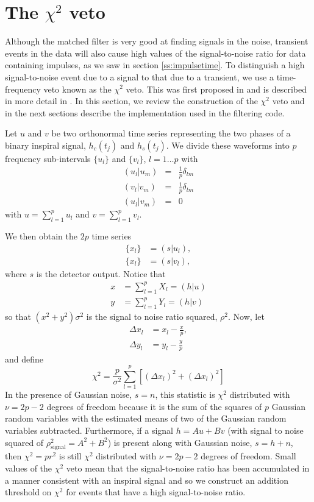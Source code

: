 \section{The $\chi^2$ veto}
\label{s:chisqcts}

Although the matched filter is very good at finding signals in the noise,
transient events in the data will also cause high values of the
signal-to-noise ratio for data containing impulses, as we saw in section
\ref{ss:impulsetime}. To distinguish a high signal-to-noise event due to a
signal to that due to a transient, we use a time-frequency veto known as the
$\chi^2$ veto. This was first proposed in \cite{grasp} and is described in
more detail in \cite{Allen:2004}.  In this section, we review the construction
of the $\chi^2$ veto and in the next sections describe the implementation used
in the filtering code.

Let $u$ and $v$ be two orthonormal time series representing the two phases of a
binary inspiral signal, $h_c(t_j)$ and $h_s(t_j)$.  We divide these waveforms
into $p$ frequency sub-intervals $\{u_l\}$ and $\{v_l\}$, $l=1\ldots p$ with
\begin{eqnarray}
  (u_l|u_m) &=& \frac{1}{p}\delta_{lm} \\
  (v_l|v_m) &=& \frac{1}{p}\delta_{lm} \\
  (u_l|v_m) &=& 0
\end{eqnarray}
with $u=\sum_{l=1}^p u_l$ and $v=\sum_{l=1}^p v_l$.

We then obtain the $2p$ time series
\begin{align}
\{x_l\} & =(s|u_l),\\ 
\{x_l\} & =(s|v_l),
\end{align}
where $s$ is the detector output. Notice that 
\begin{align}
x &= \sum_{l=1}^p X_l=(h|u) \\
y &=\sum_{l=1}^p Y_l=(h|v)
\end{align}
so that $(x^2+y^2)\sigma^2$ is the signal to noise ratio squared, $\rho^2$.
Now, let 
\begin{align}
\Delta x_l &= x_l - \frac{x}{p}, \\
\Delta y_l &= y_l - \frac{y}{p}
\end{align}
and define
\begin{equation}
\chi^2 = \frac{p}{\sigma^2} \sum_{l=1}^p \left[ (\Delta x_l)^2 + (\Delta x_l)^2 \right]
\end{equation}
In the presence of Gaussian noise, $s=n$, this statistic is $\chi^2$ distributed
with $\nu=2p-2$ degrees of freedom because it is the sum of the squares of $p$
Gaussian random variables with the estimated means of two of the Gaussian
random variables subtracted.  Furthermore, if a signal $h=Au+Bv$ (with signal
to noise squared of $\rho^2_{\mathrm{signal}}=A^2+B^2$) is present along with
Gaussian noise, $s=h+n$, then $\chi^2=pr^2$ is still $\chi^2$ distributed
with $\nu=2p-2$ degrees of freedom. Small values of the $\chi^2$ veto mean
that the signal-to-noise ratio has been accumulated in a manner consistent
with an inspiral signal and so we construct an addition threshold on $\chi^2$
for events that have a high signal-to-noise ratio.

